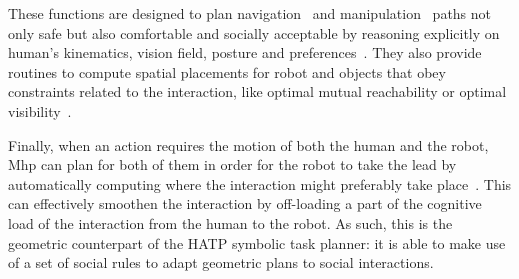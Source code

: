 \documentclass[preprint,3p,times]{elsarticle}
\begin{document}
These functions are designed to plan navigation~\cite{Sisbot2007} and
manipulation~\cite{Mainprice2011,sisbot2012human} paths not only safe but also
comfortable and socially acceptable by reasoning explicitly on human’s
kinematics, vision field, posture and
preferences~\cite{Madhava2006,kruse2013human,Rios-MartinezSL15}. They also
provide routines to compute spatial placements for robot and objects that obey
constraints related to the interaction, like optimal mutual reachability
or optimal visibility~\cite{Pandey2011}.

Finally, when an action requires the motion of both the human and the robot,
{\sc Mhp} can plan for both of them in order for the robot to take
the lead by automatically computing where the interaction might
preferably take place~\cite{Mainprice2012,waldhart2015planning}.
This can effectively smoothen the interaction by off-loading a part of the
cognitive load of the interaction from the human to the robot.
As such, this is the geometric counterpart of the HATP symbolic task
planner: it is able to make use of a set of social rules to adapt geometric plans to
social interactions.

%
%
%


\end{document}
